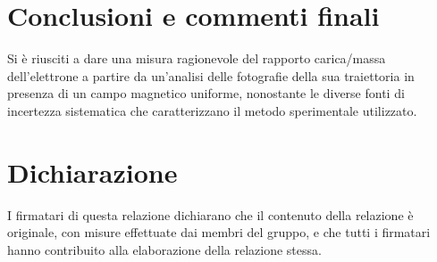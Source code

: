 \documentclass[10pt, a4paper, italian]{article}
\begin{document}
\section*{Conclusioni e commenti finali}
Si è riusciti a dare una misura ragionevole del rapporto carica/massa
dell'elettrone a partire da un'analisi delle fotografie della sua traiettoria
in presenza di un campo magnetico uniforme, nonostante le diverse fonti di
incertezza sistematica che caratterizzano il metodo sperimentale utilizzato.

\section*{Dichiarazione}
I firmatari di questa relazione dichiarano che il contenuto della relazione \`e
originale, con misure effettuate dai membri del gruppo, e che tutti i firmatari
hanno contribuito alla elaborazione della relazione stessa.

\begin{thebibliography}{1}
\end{thebibliography}
\end{document}
